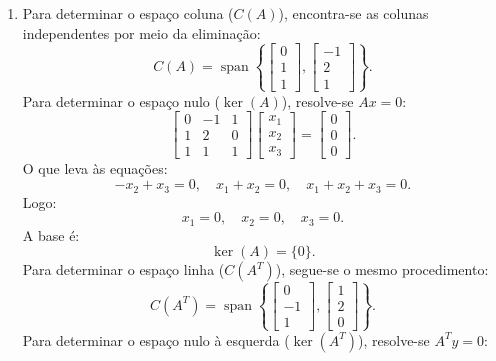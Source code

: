 \begin{resolution}
\begin{enumerate}[label=\alph*)]
    \item Para determinar o espaço coluna (\( C(A) \)), encontra-se as colunas independentes por meio da eliminação:
          \[
            C(A) = \operatorname{span}\left\{
            \begin{bmatrix} 0 \\ 1 \\ 1 \end{bmatrix},
            \begin{bmatrix} -1 \\ 2 \\ 1 \end{bmatrix}
            \right\}.
          \]
          Para determinar o espaço nulo (\( \operatorname{ker}(A) \)), resolve-se \( A x = 0 \):
          \[
            \begin{bmatrix}
              0 & -1 & 1 \\
              1 & 2  & 0 \\
              1 & 1  & 1
            \end{bmatrix}
            \begin{bmatrix}
              x_1 \\ x_2 \\ x_3
            \end{bmatrix} =
            \begin{bmatrix}
              0 \\ 0 \\ 0
            \end{bmatrix}.
          \]
          O que leva às equações:
          \[
            -x_2 + x_3 = 0, \quad x_1 + x_2 = 0, \quad x_1 + x_2 + x_3 = 0.
          \]
          Logo:
          \[
            x_1 = 0, \quad x_2 = 0, \quad x_3 = 0.
          \]
          A base é:
          \[
            \operatorname{ker}(A) = \{0\}.
          \]
          Para determinar o espaço linha (\( C(A^T) \)), segue-se o mesmo procedimento:
          \[
            C(A^T) = \operatorname{span}\left\{
            \begin{bmatrix} 0 \\ -1 \\ 1 \end{bmatrix},
            \begin{bmatrix} 1 \\ 2 \\ 0 \end{bmatrix}
            \right\}.
          \]
          Para determinar o espaço nulo à esquerda (\( \operatorname{ker}(A^T) \)), resolve-se \( A^T y = 0 \):

\end{enumerate}
\end{resolution}
